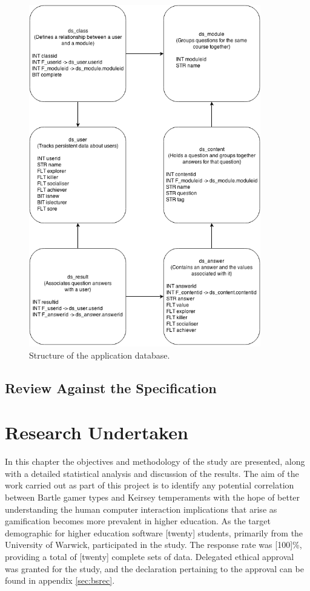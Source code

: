 \documentclass[12pt,a4paper,twoside]{report}
\begin{document}
\begin{figure}
	\begin{center}
		\includegraphics[width=0.9\textwidth]{../img/database.png}
		\caption{Structure of the application database.}
		\label{database}
	\end{center}
\end{figure}

\section{Review Against the Specification}

\chapter{Research Undertaken}
In this chapter the objectives and methodology of the study are presented, along with a detailed statistical analysis and discussion of the results. The aim of the work carried out as part of this project is to identify any potential correlation between Bartle gamer types and Keirsey temperaments with the hope of better understanding the human computer interaction implications that arise as gamification becomes more prevalent in higher education. As the target demographic for higher education software [twenty] students, primarily from the University of Warwick, participated in the study. The response rate was [100]\%, providing a total of [twenty] complete sets of data. Delegated ethical approval was granted for the study, and the declaration pertaining to the approval can be found in appendix \ref{sec:bsrec}.
\end{document}

